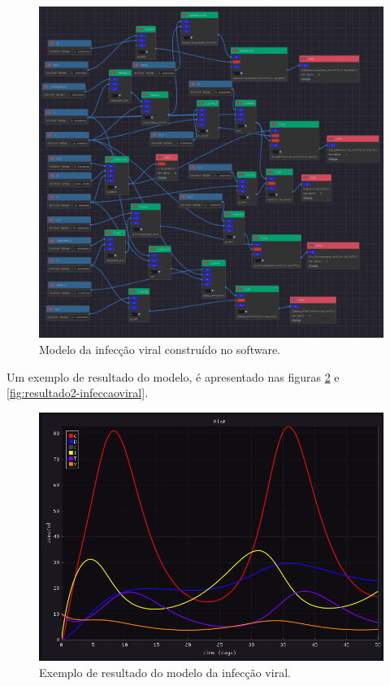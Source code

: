 \documentclass[
	12pt,				%
	openright,			%
	oneside,			%
	a4paper,			%
	main=brazil,
	english,			%
	]{ufsj-abntex2}
\begin{document}
\begin{figure}[h]
    \centering
    \includegraphics[width=\textwidth]{imgs/modelos/infeccaoviral.png} 
    \caption{Modelo da infecção viral construído no software.}
    \label{fig:infeccaoviral}
\end{figure}

Um exemplo de resultado do modelo, é apresentado nas figuras \ref{fig:resultado1-infeccaoviral} e \ref{fig:resultado2-infeccaoviral}.

\begin{figure}[h]
    \centering
    \includegraphics[width=\textwidth]{imgs/modelos/resultado1-infeccaoviral.png} 
    \caption{Exemplo de resultado do modelo da infecção viral.}
    \label{fig:resultado1-infeccaoviral}
\end{figure}
\end{document}
